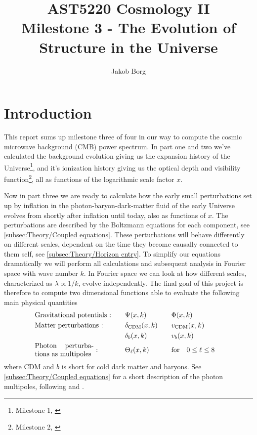 \documentclass[10pt,a4paper]{article}
\title{AST5220 Cosmology \rm{II}\\ 
\vspace{5mm}Milestone 3 - The Evolution of Structure in the Universe}
\author{Jakob Borg}
\providecommand{\rCDM}
{
    \rm{CDM}
}
\begin{document}
\maketitle
{}

\section{Introduction}
\label{sec:Introduction}
This report sums up milestone three of four in our way to compute the cosmic microwave background (CMB) power spectrum. In part one and two we've calculated the background evolution giving us the expansion history of the Universe\footnote{Milestone 1, \cite{milestone1}}, and it's ionization history giving us the optical depth and visibility function\footnote{Milestone 2, \cite{milestone2}}, all as functions of the logarithmic scale factor $x$.

Now in part three we are ready to calculate how the early small perturbations set up by inflation in the photon-baryon-dark-matter fluid of the early Universe evolves from shortly after inflation until today, also as functions of $x$. The perturbations are described by the Boltzmann equations for each component, see \cref{subsec:Theory/Coupled equations}. These perturbations will behave differently on different scales, dependent on the time they become causally connected to them self, see \cref{subsec:Theory/Horizon entry}. To simplify our equations dramatically we will perform all calculations and subsequent analysis in Fourier space with wave number $k$. In Fourier space we can look at how different scales, characterized as $\lambda \propto 1/k$, evolve independently. The final goal of this project is therefore to compute two dimensional functions able to evaluate the following main physical quantities
\begin{alignat*}{4}
    & \text{Gravitational potentials :} &\quad& \Psi(x,k) &\quad& \Phi(x,k) &
    \\
    & \text{Matter perturbations :}     &\quad& \delta_{\rCDM}(x,k) &\quad& v_{\rCDM}(x,k) &
    \\
    &                                  &\quad& \delta_{b}(x,k) &\quad& v_{b}(x,k) &
    \\
    & \text{\parbox{3cm}{Photon perturbations as multipoles} :}
                                    &\quad& \Theta_\ell(x,k) &\quad& \qfor* 0 \leq \ell \leq 8&
\end{alignat*}%
where \rm{CDM} and $b$ is short for cold dark matter and baryons. See \cref{subsec:Theory/Coupled equations} for a short description of the photon multipoles, following \cite{Calin} and \cite{Dodelson}.
\end{document}
